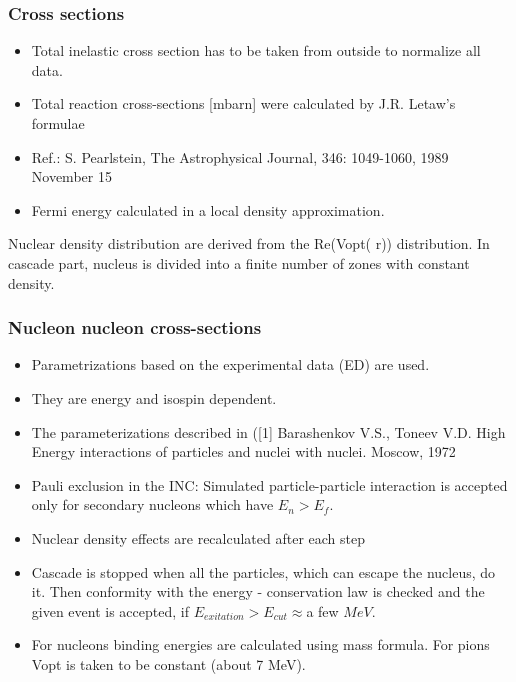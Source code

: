 \subsubsection{Cross sections}
\begin{itemize}
\item Total inelastic cross section has to be taken from outside to normalize all data. 
\item Total reaction cross-sections [mbarn] were calculated by J.R. Letaw's formulae 

 
\item Ref.: S. Pearlstein, The Astrophysical Journal, 346: 1049-1060, 1989 November 15
\item Fermi energy calculated in a local density approximation.
\end{itemize}

Nuclear density distribution are derived from the Re(Vopt( r)) distribution. In cascade part, nucleus is divided into a finite number of zones with constant density.


\subsubsection{Nucleon nucleon cross-sections}
\begin{itemize}
\item Parametrizations based on the experimental data (ED) are used. 
\item They are energy and isospin dependent. 
\item The parameterizations described in ([1] Barashenkov V.S., Toneev V.D. High Energy interactions of particles and nuclei with nuclei. Moscow, 1972 

\item Pauli exclusion in the INC: Simulated particle-particle interaction is accepted only for secondary nucleons which have $E_n > E_f$.

\item Nuclear density effects are recalculated after each step

\item Cascade is stopped when all the particles, which can escape the nucleus, do it. Then conformity with the energy - conservation law is checked and the given event is accepted, if $E_{exitation} > E_{cut} \approx $a few $MeV$.

\item For nucleons binding energies are calculated using mass formula. For pions Vopt is taken to be constant (about 7 MeV).
\end{itemize}

